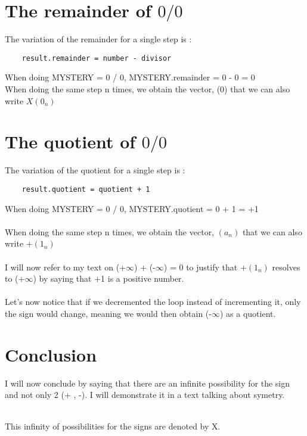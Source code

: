 \documentclass{article}
\begin{document}
  \section{The remainder of $0/0$}
  The variation of the remainder for a single step is :
  ~\\
  \begin{verbatim}
    result.remainder = number - divisor
  \end{verbatim}
  When doing MYSTERY = 0 / 0, MYSTERY.remainder = 0 - 0 =  0
  ~\\
  When doing the same step n times, we obtain the vector, (0) that we can also write $X(0_n)$
  \section{The quotient of $0/0$}
  The variation of the quotient for a single step is :
  ~\\
  \begin{verbatim}
    result.quotient = quotient + 1
  \end{verbatim}
  When doing MYSTERY = 0 / 0, MYSTERY.quotient = 0 + 1 = +1
  ~\\
  ~\\
  When doing the same step n times, we obtain the vector, $(a_n)$ that we can also write $+(1_n)$
  ~\\
  ~\\
  I will now refer to my text on (+$\infty$) + (-$\infty$) = 0 to justify that $+(1_n)$ resolves to (+$\infty$) by saying that +1 is a positive number.
  ~\\
  ~\\
  Let's now notice that if we decremented the loop instead of incrementing it, only the sign would change, meaning we would then obtain (-$\infty$) as a quotient.
  \section{Conclusion}
  I will now conclude by  saying that there are an infinite possibility for the sign and not only 2 (+ , -). I will demonstrate it in a text talking about symetry.
  ~\\
  ~\\
  \centerline{
  This infinity of possibilities for the signs are denoted by X.
  }
\end{document}
